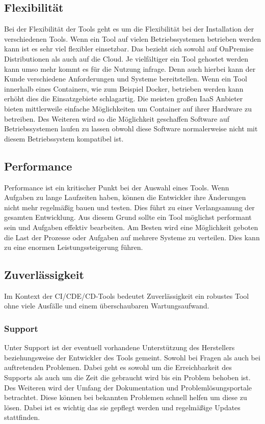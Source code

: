 \subsection{Flexibilität}
Bei der Flexibilität der Tools geht es um die Flexibilität bei der Installation der verschiedenen Tools. Wenn ein Tool auf vielen Betriebssystemen betrieben werden kann ist es sehr viel flexibler einsetzbar. Das bezieht sich sowohl auf OnPremise Distributionen als auch auf die Cloud. Je vielfältiger ein Tool gehostet werden kann umso mehr kommt es für die Nutzung infrage. Denn auch hierbei kann der Kunde verschiedene Anforderungen und Systeme bereitstellen. Wenn ein Tool innerhalb eines Containers, wie zum Beispiel Docker, betrieben werden kann erhöht dies die Einsatzgebiete schlagartig. Die meisten großen \ac{IaaS} Anbieter bieten mittlerweile einfache Möglichkeiten um Container auf ihrer Hardware zu betreiben. Des Weiteren wird so die Möglichkeit geschaffen Software auf Betriebssystemen laufen zu lassen obwohl diese Software normalerweise nicht mit diesem Betriebssystem kompatibel ist.
\subsection{Performance}
Performance ist ein kritischer Punkt bei der Auswahl eines Tools. Wenn Aufgaben zu lange Laufzeiten haben, können die Entwickler ihre Änderungen nicht mehr regelmäßig bauen und testen. Dies führt zu einer Verlangsamung der gesamten Entwicklung. Aus diesem Grund sollte ein Tool möglichst performant sein und Aufgaben effektiv bearbeiten. Am Besten wird eine Möglichkeit geboten die Last der Prozesse oder Aufgaben auf mehrere Systeme zu verteilen. Dies kann zu eine enormen Leistungssteigerung führen. 
\subsection{Zuverlässigkeit}
Im Kontext der \ac{CI}/\ac{CDE}/\ac{CD}-Tools bedeutet Zuverlässigkeit ein robustes Tool ohne viele Ausfälle und einem überschaubaren Wartungsaufwand.
\subsubsection{Support}
Unter Support ist der eventuell vorhandene Unterstützung des Herstellers beziehungsweise der Entwickler des Tools gemeint. Sowohl bei Fragen als auch bei auftretenden Problemen. Dabei geht es sowohl um die Erreichbarkeit des Supports als auch um die Zeit die gebraucht wird bis ein Problem behoben ist. Des Weiteren wird der Umfang der Dokumentation und Problemlösungsportale betrachtet. Diese können bei bekannten Problemen schnell helfen um diese zu lösen. Dabei ist es wichtig das sie gepflegt werden und regelmäßige Updates stattfinden.
